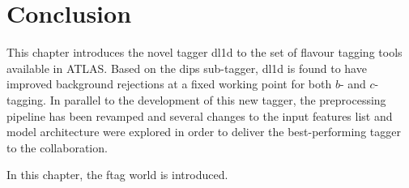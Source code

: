 \section{Conclusion}
This chapter introduces the novel tagger \gls{dl1d} to the set of flavour tagging tools available in ATLAS. Based on the \gls{dips} sub-tagger, \gls{dl1d} is found to have improved background rejections at a fixed working point for both $b$- and $c$-tagging. In parallel to the development of this new tagger, the preprocessing pipeline has been revamped and several changes to the input features list and model architecture were explored in order to deliver the best-performing tagger to the collaboration. 
\clearpage


\begin{tcolorbox}[colback=oxfordblue!5,colframe=blue!40!black,title=Summary of the Chapter]
In this chapter, the \gls{ftag} world is introduced. 
\end{tcolorbox}